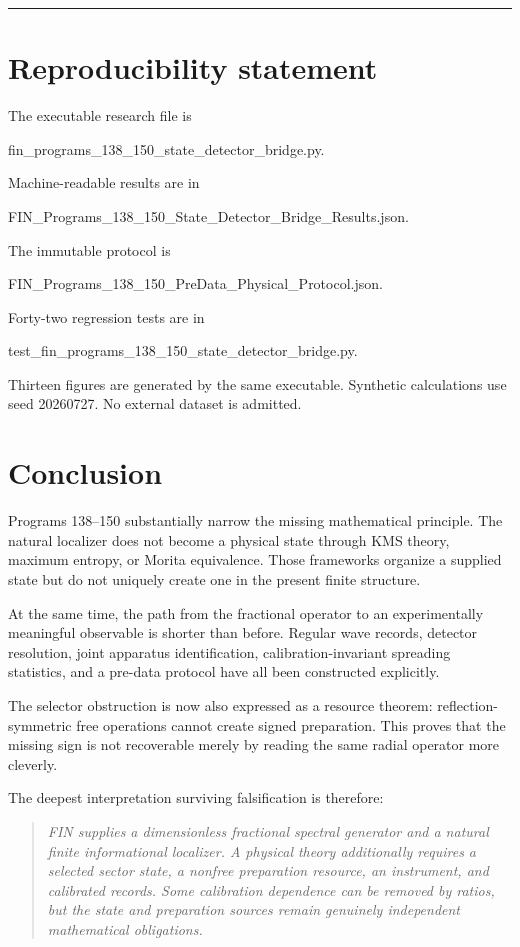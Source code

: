 \documentclass[11pt,a4paper,openany]{report}
\begin{document}
\par\medskip\hrule\medskip

\chapter{Reproducibility statement}

The executable research file is

fin\_programs\_138\_150\_state\_detector\_bridge.py.

Machine-readable results are in

FIN\_Programs\_138\_150\_State\_Detector\_Bridge\_Results.json.

The immutable protocol is

FIN\_Programs\_138\_150\_PreData\_Physical\_Protocol.json.

Forty-two regression tests are in

test\_fin\_programs\_138\_150\_state\_detector\_bridge.py.

Thirteen figures are generated by the same executable. Synthetic calculations use seed 20260727. No external dataset is admitted.

\chapter{Conclusion}

Programs 138--150 substantially narrow the missing mathematical principle. The natural localizer does not become a physical state through KMS theory, maximum entropy, or Morita equivalence. Those frameworks organize a supplied state but do not uniquely create one in the present finite structure.

At the same time, the path from the fractional operator to an experimentally meaningful observable is shorter than before. Regular wave records, detector resolution, joint apparatus identification, calibration-invariant spreading statistics, and a pre-data protocol have all been constructed explicitly.

The selector obstruction is now also expressed as a resource theorem: reflection-symmetric free operations cannot create signed preparation. This proves that the missing sign is not recoverable merely by reading the same radial operator more cleverly.

The deepest interpretation surviving falsification is therefore:

\begin{quote}\itshape
FIN supplies a dimensionless fractional spectral generator and a natural finite informational localizer. A physical theory additionally requires a selected sector state, a nonfree preparation resource, an instrument, and calibrated records. Some calibration dependence can be removed by ratios, but the state and preparation sources remain genuinely independent mathematical obligations.

\end{quote}
\end{document}
